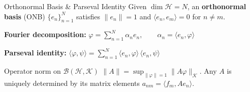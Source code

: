 \documentclass{beamer}
\newcommand{\Hilb}{\mathcal{H}}
\newcommand{\Bound}{\mathcal{B}}
\newcommand{\ip}[2]{\langle #1, #2 \rangle}
\newcommand{\norm}[1]{\|#1\|}
\begin{document}
\begin{frame}[shrink=10]{Orthonormal Basis \& Parseval Identity}
  \small
  Given $\dim\Hilb = N$, an \textbf{orthonormal basis} (ONB) $\{e_n\}_{n=1}^N$ satisfies
  $\norm{e_n}=1$ and $\ip{e_n}{e_m}=0$ for $n\ne m$.

  \vspace{0.2em}
  \begin{tcolorbox}[mathbox, left=3pt, right=3pt, top=2pt, bottom=2pt]
    \textbf{Fourier decomposition:}\quad
    $\varphi = \displaystyle\sum_{n=1}^N \alpha_n e_n, \qquad \alpha_n = \ip{e_n}{\varphi}$
  \end{tcolorbox}

  \vspace{0.2em}
  \begin{tcolorbox}[mathbox, left=3pt, right=3pt, top=2pt, bottom=2pt]
    \textbf{Parseval identity:}\quad
    $\ip{\varphi}{\psi} = \displaystyle\sum_{n=1}^N \ip{e_n}{\varphi}\,\ip{e_n}{\psi}$
  \end{tcolorbox}

  \vspace{0.2em}
  \begin{alertblock}{Operator norm on $\Bound(\Hilb,\mathcal{K})$}
  \justifying
    $\norm{A} = \sup_{\norm{\varphi}=1}\norm{A\varphi}_{\mathcal K}$. Any $A$ is
    uniquely determined by its matrix elements $a_{nm}=\ip{f_m}{Ae_n}$.
  \end{alertblock}
\end{frame}
\end{document}
